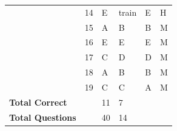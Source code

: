 \documentclass[pageno]{jpaper}
\begin{document}
\begin{table}[]
\begin{tabular}{llllll}
\textbf{}                & 14                                  & E                                          & train                                       & E                                           & H                                       \\
\textbf{}                & 15                                  & A                                          & B                                           & B                                           & M                                       \\
\textbf{}                & 16                                  & E                                          & E                                           & E                                           & M                                       \\
\textbf{}                & 17                                  & C                                          & D                                           & D                                           & M                                       \\
\textbf{}                & 18                                  & A                                          & B                                           & B                                           & M                                       \\
\textbf{}                & 19                                  & C                                          & C                                           & A                                           & M                                       \\ \midrule
\textbf{Total Correct}   &                                     & 11                                         & 7                                           &                                             &                                         \\
\textbf{Total Questions} &                                     & 40                                         & 14                                          &                                             &                                         \\ \bottomrule
\end{tabular}
\end{table}
\end{document}

